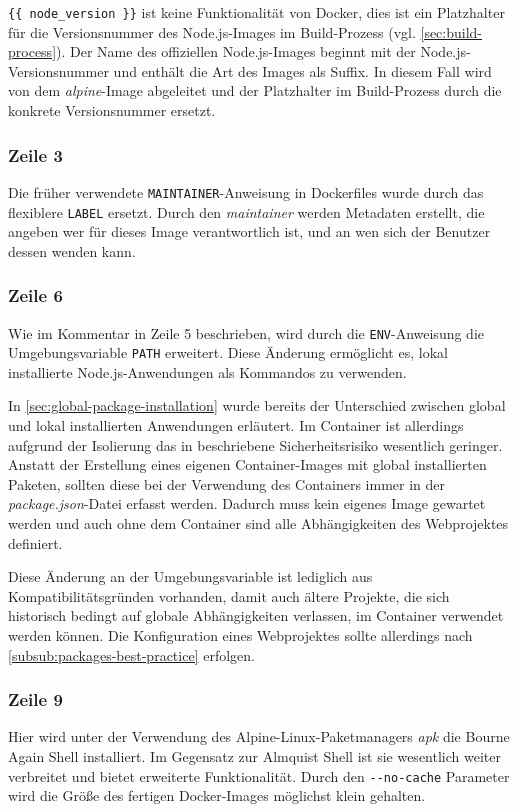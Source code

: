 \verb|{{ node_version }}| ist keine Funktionalität von Docker, dies ist ein Platzhalter für die Versionsnummer des Node.js-Images im Build-Prozess (vgl. \cref{sec:build-process}).
Der Name des offiziellen Node.js-Images beginnt mit der Node.js-Versionsnummer und enthält die Art des Images als Suffix.
In diesem Fall wird von dem \emph{alpine}-Image abgeleitet und der Platzhalter im Build-Prozess durch die konkrete Versionsnummer ersetzt.

\subsubsection{Zeile 3}
Die früher verwendete \verb|MAINTAINER|-Anweisung in Dockerfiles wurde durch das flexiblere \verb|LABEL| ersetzt.
Durch den \emph{maintainer} werden Metadaten erstellt, die angeben wer für dieses Image verantwortlich ist, und an wen sich der Benutzer dessen wenden kann.

\subsubsection{Zeile 6}
Wie im Kommentar in Zeile 5 beschrieben, wird durch die \verb|ENV|-Anweisung die Umgebungsvariable \verb|PATH| erweitert.
Diese Änderung ermöglicht es, lokal installierte Node.js-Anwendungen als Kommandos zu verwenden.

In \cref{sec:global-package-installation} wurde bereits der Unterschied zwischen global und lokal installierten Anwendungen erläutert.
Im Container ist allerdings aufgrund der Isolierung das in \autocite{stackoverflow:nodemodules-hack:online} beschriebene Sicherheitsrisiko wesentlich geringer.
Anstatt der Erstellung eines eigenen Container-Images mit global installierten Paketen, sollten diese bei der Verwendung des Containers immer in der \emph{package.json}-Datei erfasst werden.
Dadurch muss kein eigenes Image gewartet werden und auch ohne dem Container sind alle Abhängigkeiten des Webprojektes definiert.

Diese Änderung an der Umgebungsvariable ist lediglich aus Kompatibilitätsgründen vorhanden, damit auch ältere Projekte, die sich historisch bedingt auf globale Abhängigkeiten verlassen, im Container verwendet werden können.
Die Konfiguration eines Webprojektes sollte allerdings nach \cref{subsub:packages-best-practice} erfolgen.

\subsubsection{Zeile 9}
Hier wird unter der Verwendung des Alpine-Linux-Paketmanagers \emph{apk} die Bourne Again Shell installiert.
Im Gegensatz zur Almquist Shell ist sie wesentlich weiter verbreitet und bietet erweiterte Funktionalität.
Durch den \verb|--no-cache| Parameter wird die Größe des fertigen Docker-Images möglichst klein gehalten.

